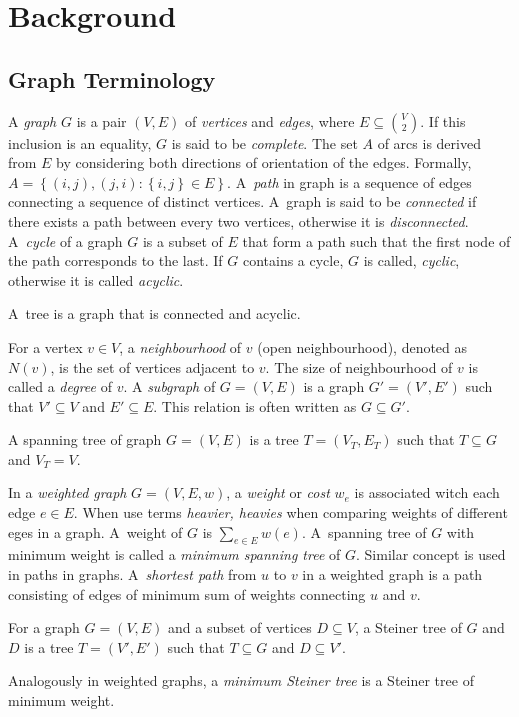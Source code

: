 \chapter{Background}\label{sec:back}

\section{Graph Terminology}\label{sec:back:graph}

A \emph{graph} $G$ is a pair $(V,E)$ of \emph{vertices} and \emph{edges}, where $E\subseteq {{V}\choose{2}}$.
If this inclusion is an equality, $G$ is said to be \emph{complete}.
 The set $A$ of arcs is derived from $E$ by considering both directions of orientation of the edges.
 Formally, $A=\left\{(i,j),(j,i):\left\{i,j\right\}\in E\right\}$.
A~\emph{path} in graph is a sequence of edges connecting a sequence of distinct vertices.
A~graph is said to be \emph{connected} if there exists a path between every two vertices, otherwise it is \emph{disconnected}.
A~\emph{cycle} of a graph $G$ is a subset of $E$ that form a path such that the first node of the path corresponds to the last. 
If $G$ contains a cycle, $G$ is called, \emph{cyclic}, otherwise it is called \emph{acyclic}.
\begin{definition}
A~tree is a graph that is connected and acyclic.
\end{definition}
For a vertex $v\in V$, a \emph{neighbourhood} of $v$ (open neighbourhood), denoted as $N(v)$, is the set of vertices adjacent to $v$.
The size of neighbourhood of $v$ is called a \emph{degree} of $v$.
A \emph{subgraph} of $G=(V,E)$ is a graph $G'=(V',E')$ such that $V'\subseteq V$ and $E'\subseteq E$.
This relation is often written as $G\subseteq G'$.
\begin{definition}
A spanning tree of graph $G=(V,E)$ is a tree $T=(V_T,E_T)$ such that $T\subseteq G$ and $V_T=V$.
\end{definition}

In a \emph{weighted graph} $G=(V,E,w)$, a \emph{weight} or \emph{cost} $w_e$ is associated witch each edge $e\in E$.
When use terms \emph{heavier, heavies} when comparing weights of different eges in a graph.
A~weight of $G$ is $\sum_{e\in E}w(e)$.
A~spanning tree of $G$ with minimum weight is called a \emph{minimum spanning tree} of $G$.
Similar concept is used in paths in graphs.
A~\emph{shortest path} from $u$ to $v$ in a weighted graph is a path consisting of edges of minimum sum of weights connecting $u$ and $v$.
\begin{definition}
	For a graph $G=(V,E)$ and a subset of vertices $D\subseteq V$, a Steiner tree of $G$ and $D$ is a tree $T=(V',E')$ such that $T\subseteq G$ and $D\subseteq V'$.
\end{definition}
Analogously in weighted graphs, a \emph{minimum Steiner tree} is a Steiner tree of minimum weight.

